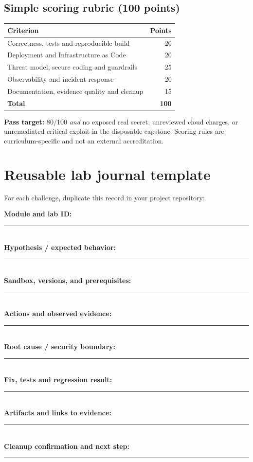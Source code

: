\documentclass[10pt,letterpaper,oneside]{article}
\begin{document}
\subsection{Simple scoring rubric (100 points)}
\begin{tabularx}{\linewidth}{@{}Xr@{}}
\toprule Criterion & Points\\\midrule
Correctness, tests and reproducible build & 20\\
Deployment and Infrastructure as Code & 20\\
Threat model, secure coding and guardrails & 25\\
Observability and incident response & 20\\
Documentation, evidence quality and cleanup & 15\\\midrule
\textbf{Total} & \textbf{100}\\\bottomrule
\end{tabularx}
\textbf{Pass target:} 80/100 \emph{and} no exposed real secret, unreviewed cloud charges, or unremediated critical exploit in the disposable capstone. Scoring rules are curriculum-specific and not an external accreditation.
\section{Reusable lab journal template}
For each challenge, duplicate this record in your project repository:
\begin{notebox}
\textbf{Module and lab ID:} \rule{.61\linewidth}{.25pt}\\[5pt]
\textbf{Hypothesis / expected behavior:} \rule{.54\linewidth}{.25pt}\\[5pt]
\textbf{Sandbox, versions, and prerequisites:} \rule{.41\linewidth}{.25pt}\\[5pt]
\textbf{Actions and observed evidence:} \rule{.50\linewidth}{.25pt}\\[5pt]
\textbf{Root cause / security boundary:} \rule{.48\linewidth}{.25pt}\\[5pt]
\textbf{Fix, tests and regression result:} \rule{.45\linewidth}{.25pt}\\[5pt]
\textbf{Artifacts and links to evidence:} \rule{.51\linewidth}{.25pt}\\[5pt]
\textbf{Cleanup confirmation and next step:} \rule{.42\linewidth}{.25pt}
\end{notebox}
\end{document}
